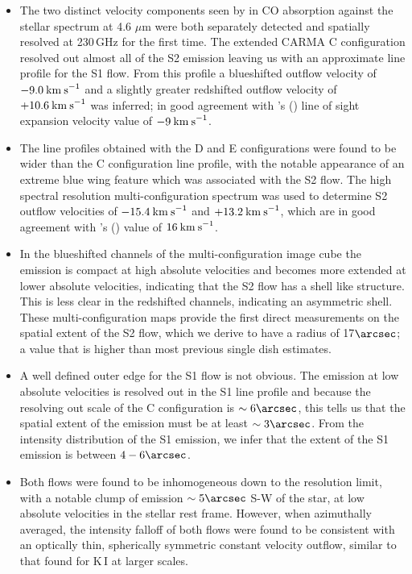 \begin{itemize}

\item The two distinct velocity components seen by \cite{bernat_1979} in CO absorption against the stellar spectrum at 4.6 $\mu$m were both separately detected and spatially resolved at 230\,GHz for the first time. The extended CARMA C configuration resolved out almost all of the S2 emission leaving us with an approximate line profile for the S1 flow. From this profile a blueshifted outflow velocity of $-9.0\>{\rm km\>s}^{-1}$ and a slightly greater redshifted outflow velocity of $+10.6\>{\rm km\>s}^{-1}$ was inferred; in good agreement with \citeauthor{bernat_1979}'s (\citeyear{bernat_1979}) line of sight expansion velocity value of $-9\>{\rm km\>s}^{-1}$.  

\item The line profiles obtained with the D and E configurations were found to be wider than the C configuration line profile, with the notable appearance of an extreme blue wing feature which was associated with the S2 flow. The high spectral resolution multi-configuration spectrum was used to determine S2 outflow velocities of $-15.4\>{\rm km\>s}^{-1}$ and $+13.2\>{\rm km\>s}^{-1}$, which are in good agreement with \citeauthor{bernat_1979}'s (\citeyear{bernat_1979})  value of $16\>{\rm km\>s}^{-1}$.  

\item In the blueshifted channels of the  multi-configuration image cube the emission is compact at high absolute velocities and becomes more extended at lower absolute velocities, indicating that the S2 flow has a shell like structure. This is less clear in the redshifted channels, indicating an asymmetric shell. These multi-configuration maps provide the first direct measurements on the spatial extent of the S2 flow, which we derive to have a radius of 17$\arcsec$; a value that is higher than most previous single dish estimates. 

\item A well defined outer edge for the S1 flow is not obvious. The emission at low absolute velocities is resolved out in the S1 line profile and because the resolving out scale of the C configuration is $\sim 6\arcsec$, this tells us that the spatial extent of the emission must be at least $\sim 3\arcsec$. From the intensity distribution of the S1 emission, we infer that the extent of the S1 emission is between $4-6\arcsec$.

\item Both flows were found to be inhomogeneous down to the resolution limit, with a notable clump of emission $\sim 5\arcsec$ S-W of the star, at low absolute velocities in the stellar rest frame. However, when azimuthally averaged, the intensity falloff of both flows were found to be consistent with an optically thin, spherically symmetric constant velocity outflow, similar to that found for K\,I at larger scales.


\end{itemize}
